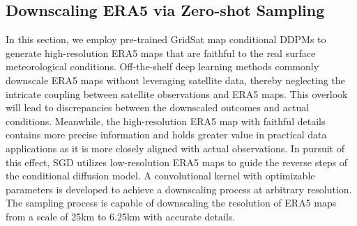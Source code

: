 \subsection{Downscaling ERA5 via Zero-shot Sampling}
In this section, we employ pre-trained GridSat map conditional DDPMs to generate high-resolution ERA5 maps that are faithful to the real surface meteorological conditions. 
Off-the-shelf deep learning methods commonly downscale ERA5 maps without leveraging satellite data, thereby neglecting the intricate coupling between satellite observations and ERA5 maps. 
This overlook will lead to discrepancies between the downscaled outcomes and actual conditions.
Meanwhile, the high-resolution ERA5 map with faithful details contains more precise information and holds greater value in practical data applications as it is more closely aligned with actual observations. 
In pursuit of this effect, SGD utilizes low-resolution ERA5 maps to guide the reverse steps of the conditional diffusion model.
A convolutional kernel with optimizable parameters is developed to achieve a downscaling process at arbitrary resolution. 
The sampling process is capable of downscaling the resolution of ERA5 maps from a scale of 25km to 6.25km with accurate details.

